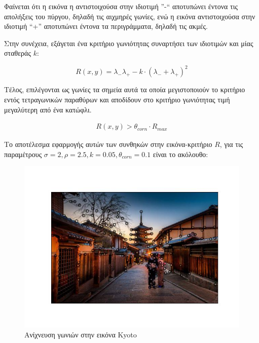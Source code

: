 \documentclass{article}
\newcommand{\eng}[1]{\foreignlanguage{english}{#1}}
\begin{document}
Φαίνεται ότι η εικόνα η αντιστοιχούσα στην ιδιοτιμή ''-`` αποτυπώνει έντονα τις απολήξεις του πύργου, δηλαδή τις αιχμηρές γωνίες, ενώ η εικόνα αντιστοιχούσα στην ιδιοτιμή ``+'' αποτυπώνει έντονα τα περιγράμματα, δηλαδή τις ακμές.

Στην συνέχεια, εξάγεται ένα κριτήριο γωνιότητας συναρτήσει των ιδιοτιμών και μίας σταθεράς $k$:

\begin{equation}
    R(x, y) = \lambda_{-}\lambda_{+} - k\cdot\left(\lambda_{-} + \lambda_{+}\right)^2
\end{equation}

Τέλος, επιλέγονται ως γωνίες τα σημεία αυτά τα οποία μεγιστοποιούν το κριτήριο εντός τετραγωνικών παραθύρων και αποδίδουν στο κριτήριο γωνιότητας τιμή μεγαλύτερη από ένα κατώφλι.

\begin{equation}
    \begin{gathered}
        R(x, y) > \theta_{corn} \cdot R_{max} 
    \end{gathered}
\end{equation}

Το αποτέλεσμα εφαρμογής αυτών των συνθηκών στην εικόνα-κριτήριο $R$, για τις παραμέτρους $\sigma = 2, \rho = 2.5, k = 0.05, \theta_{corn} = 0.1$ είναι το ακόλουθο:
       

\begin{figure}[h]
    \centering
    \includegraphics[width=\textwidth]{../image-plots/corner-detection.jpg}
    \caption{Ανίχνευση γωνιών στην εικόνα \eng{Kyoto}}
    \label{fig:kyoto-corners}
\end{figure}
\FloatBarrier
\end{document}
